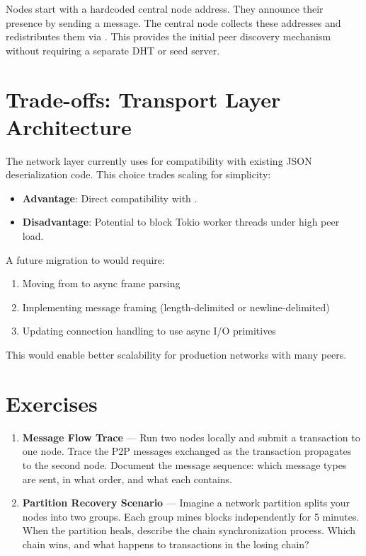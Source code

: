 \begin{notebox}
Nodes start with a hardcoded central node address. They announce their presence by sending a  message. The central node collects these addresses and redistributes them via . This provides the initial peer discovery mechanism without requiring a separate DHT or seed server.
\end{notebox}

\section{Trade-offs: Transport Layer Architecture}
\label{sec:ch12-transport-tradeoffs}

The network layer currently uses  for compatibility with existing JSON deserialization code. This choice trades scaling for simplicity:

\begin{itemize}
  \item \textbf{Advantage}: Direct compatibility with .
  \item \textbf{Disadvantage}: Potential to block Tokio worker threads under high peer load.
\end{itemize}

A future migration to  would require:

\begin{enumerate}
  \item Moving from  to async frame parsing
  \item Implementing message framing (length-delimited or newline-delimited)
  \item Updating connection handling to use async I/O primitives
\end{enumerate}

This would enable better scalability for production networks with many peers.

\section{Exercises}
\label{sec:ch12-exercises}

\begin{enumerate}
  \item \textbf{Message Flow Trace} --- Run two nodes locally and submit a transaction to one node. Trace the P2P messages exchanged as the transaction propagates to the second node. Document the message sequence: which message types are sent, in what order, and what each contains.

  \item \textbf{Partition Recovery Scenario} --- Imagine a network partition splits your nodes into two groups. Each group mines blocks independently for 5 minutes. When the partition heals, describe the chain synchronization process. Which chain wins, and what happens to transactions in the losing chain?
\end{enumerate}

